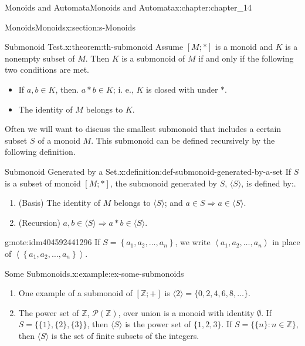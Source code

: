 \documentclass[twoside,10pt,]{book}
\numberwithin{equation}{section}
\begin{document}
\begin{chapterptx}{Monoids and Automata}{}{Monoids and Automata}{}{}{x:chapter:chapter_14}
\begin{sectionptx}{Monoids}{}{Monoids}{}{}{x:section:s-Monoids}
\begin{theorem}{Submonoid Test.}{}{x:theorem:th-submonoid}%
Assume \([M; *]\)  is a monoid and \(K\) is a nonempty subset of \(M\). Then \(K\) is a submonoid of \(M\) if and only if the following two conditions are met.%
\begin{itemize}[label=\textbullet]
\item{}If \(a,b\in K\), then.  \(a*b\in K\); i. e., \(K\)  is closed with under \(*\).%
\item{}The identity of \(M\) belongs to \(K\).%
\end{itemize}
%
\end{theorem}
Often we will want to discuss the smallest submonoid that includes a certain subset \(S\) of a monoid \(M\). This submonoid can be defined recursively by the following definition.%
\begin{definition}{Submonoid Generated by a Set.}{x:definition:def-submonoid-generated-by-a-set}%
%
If \(S\) is a subset of monoid \([M;*]\), the submonoid generated by \(S\), \(\langle S\rangle\), is defined by:.%
\begin{enumerate}[label=(\alph*)]
\item{}(Basis) The identity of \(M\) belongs to \(\langle
S\rangle\); and \(a\in S \Rightarrow a\in \langle S \rangle\).%
\item{}(Recursion) \(a,b\in \langle S\rangle \Rightarrow a*b\in \langle S\rangle\).%
\end{enumerate}
%
\end{definition}
\begin{note}{}{g:note:idm404592441296}%
If \(S=\left\{a_1,a_2,\ldots ,a_n\right\}\), we write \(\left\langle a_1,a_2,\ldots ,a_n\right\rangle\) in place of \(\left\langle \left\{a_1,a_2,\ldots
,a_n\right\}\right\rangle\).%
\end{note}
\begin{example}{Some Submonoids.}{x:example:ex-some-submonoids}%
%
\begin{enumerate}[label=(\alph*)]
\item{}One example of a submonoid of \([\mathbb{Z};+]\) is \(\langle 2\rangle =\{0,2,4,6,8,\ldots \}\).%
\item{}The power set of \(\mathbb{Z}\), \(\mathcal{P}(\mathbb{Z})\), over union is a monoid with identity \(\emptyset\). If \(S=\{\{1\},\{2\},\{3\}\}\), then \(\langle S \rangle\) is the power set of \(\{1,2,3\}\). If \(S=\{\{n\}:n\in \mathbb{Z}\},\) then \(\langle S\rangle\) is the set of finite subsets of the integers.%

\end{enumerate}
\end{example}
\end{sectionptx}
\end{chapterptx}
\end{document}
